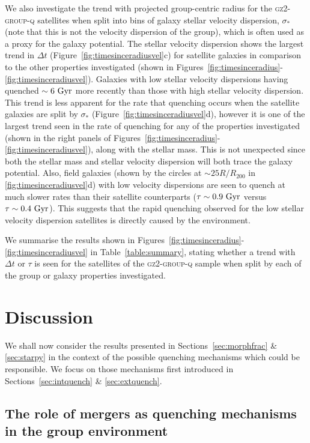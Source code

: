 \documentclass[useAMS,usenatbib]{mn2e}
\begin{document}
We also investigate the trend with projected group-centric radius for the \textsc{gz2-group-q} satellites when split into bins of galaxy stellar velocity dispersion, $\sigma_*$ (note that this is not the velocity dispersion of the group), which is often used as a proxy for the galaxy potential. The stellar velocity dispersion shows the largest trend in $\Delta t$ (Figure~\ref{fig:timesinceradiusvel}c) for satellite galaxies in comparison to the other properties investigated (shown in Figures~\ref{fig:timesinceradius}-\ref{fig:timesinceradiusvel}). Galaxies with low stellar velocity dispersions having quenched $\sim6~\rm{Gyr}$ more recently than those with high stellar velocity dispersion. This trend is less apparent for the rate that quenching occurs when the satellite galaxies are split by $\sigma_*$ (Figure~\ref{fig:timesinceradiusvel}d), however it is one of the largest trend seen in the rate of quenching for any of the properties investigated (shown in the right panels of Figures~\ref{fig:timesinceradius}-\ref{fig:timesinceradiusvel}), along with the stellar mass. This is not unexpected since both the stellar mass and stellar velocity dispersion will both trace the galaxy potential. Also, field galaxies (shown by the circles at $\sim 25 R/R_{200}$ in \ref{fig:timesinceradiusvel}d) with low velocity dispersions are seen to quench at much slower rates than their satellite counterparts ($\tau\sim0.9~\rm{Gyr}$ versus $\tau\sim0.4~\rm{Gyr}$). This suggests that the rapid quenching observed for the low stellar velocity dispersion satellites is directly caused by the environment. 

We summarise the results shown in Figures~\ref{fig:timesinceradius}-\ref{fig:timesinceradiusvel} in Table~\ref{table:summary}, stating whether a trend with $\Delta t$ or $\tau$ is seen for the satellites of the \textsc{gz2-group-q} sample when split by each of the group or galaxy properties investigated. 


\section{Discussion}\label{sec:disc}

We shall now consider the results presented in Sections~\ref{sec:morphfrac} \& \ref{sec:starpy} in the context of the possible quenching mechanisms which could be responsible. We focus on those mechanisms first introduced in Sections~\ref{sec:intquench} \& \ref{sec:extquench}. 

\subsection{The role of mergers as quenching mechanisms in the group environment}\label{sec:rolemergerenv}
\end{document}
